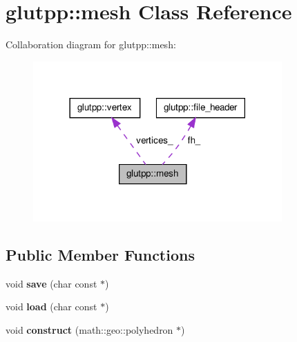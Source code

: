 \hypertarget{classglutpp_1_1mesh}{\section{glutpp\-:\-:mesh \-Class \-Reference}
\label{classglutpp_1_1mesh}
}


\-Collaboration diagram for glutpp\-:\-:mesh\-:
\nopagebreak
\begin{figure}[H]
\begin{center}
\leavevmode
\includegraphics[width=270pt]{classglutpp_1_1mesh__coll__graph}
\end{center}
\end{figure}
\subsection*{\-Public \-Member \-Functions}
\begin{DoxyCompactItemize}
\item 
\hypertarget{classglutpp_1_1mesh_a80555f3c7fe096015bbd3349742372cf}{void {\bfseries save} (char const $\ast$)}\label{classglutpp_1_1mesh_a80555f3c7fe096015bbd3349742372cf}

\item 
\hypertarget{classglutpp_1_1mesh_a15e84ee2548fc25bf38bf170d9ef1473}{void {\bfseries load} (char const $\ast$)}\label{classglutpp_1_1mesh_a15e84ee2548fc25bf38bf170d9ef1473}

\item 
\hypertarget{classglutpp_1_1mesh_a38ac06e9bf9628f098a1c59467163abc}{void {\bfseries construct} (math\-::geo\-::polyhedron $\ast$)}\label{classglutpp_1_1mesh_a38ac06e9bf9628f098a1c59467163abc}

\end{DoxyCompactItemize}
